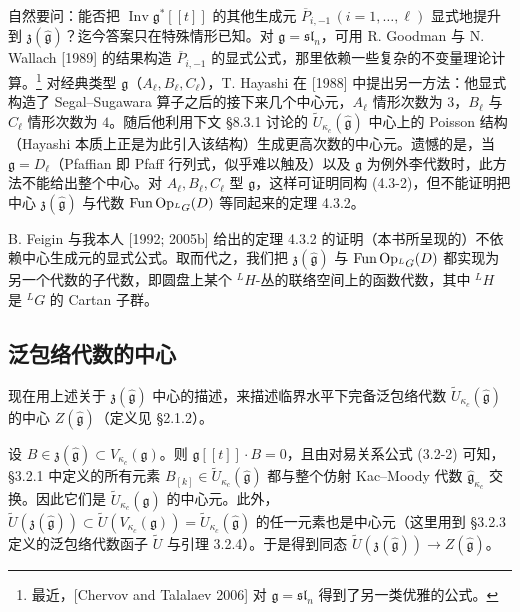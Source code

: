 自然要问：能否把 $\operatorname{Inv}\mathfrak{g}^*[[t]]$ 的其他生成元 $\overline{P}_{i,-1}\,(i=1,\dots,\ell)$ 显式地提升到 $\mathfrak{z}(\hat{\mathfrak{g}})$？迄今答案只在特殊情形已知。对 $\mathfrak{g}=\mathfrak{sl}_n$，可用 R. Goodman 与 N. Wallach [1989] 的结果构造 $\overline{P}_{i,-1}$ 的显式公式，那里依赖一些复杂的不变量理论计算。\footnote{最近，[Chervov and Talalaev 2006] 对 $\mathfrak{g}=\mathfrak{sl}_n$ 得到了另一类优雅的公式。} 对经典类型 $\mathfrak{g}$（$A_\ell,B_\ell,C_\ell$），T. Hayashi 在 [1988] 中提出另一方法：他显式构造了 Segal--Sugawara 算子之后的接下来几个中心元，$A_\ell$ 情形次数为 $3$，$B_\ell$ 与 $C_\ell$ 情形次数为 $4$。随后他利用下文 §8.3.1 讨论的 $\widetilde{U}_{\kappa_c}(\hat{\mathfrak{g}})$ 中心上的 Poisson 结构（Hayashi 本质上正是为此引入该结构）生成更高次数的中心元。遗憾的是，当 $\mathfrak{g}=D_\ell$（Pfaffian 即 Pfaff 行列式，似乎难以触及）以及 $\mathfrak{g}$ 为例外李代数时，此方法不能给出整个中心。对 $A_\ell,B_\ell,C_\ell$ 型 $\mathfrak{g}$，这样可证明同构 (4.3-2)，但不能证明把中心 $\mathfrak{z}(\hat{\mathfrak{g}})$ 与代数 $\operatorname{Fun}\operatorname{Op}_{{}^LG}(D)$ 等同起来的定理 4.3.2。

B. Feigin 与我本人 [1992; 2005b] 给出的定理 4.3.2 的证明（本书所呈现的）不依赖中心生成元的显式公式。取而代之，我们把 $\mathfrak{z}(\hat{\mathfrak{g}})$ 与 $\operatorname{Fun}\operatorname{Op}_{{}^LG}(D)$ 都实现为另一个代数的子代数，即圆盘上某个 ${}^LH$-丛的联络空间上的函数代数，其中 ${}^LH$ 是 ${}^LG$ 的 Cartan 子群。

\subsection{泛包络代数的中心}

现在用上述关于 $\mathfrak{z}(\hat{\mathfrak{g}})$ 中心的描述，来描述临界水平下完备泛包络代数 $\widetilde{U}_{\kappa_c}(\hat{\mathfrak{g}})$ 的中心 $Z(\hat{\mathfrak{g}})$（定义见 §2.1.2）。

设 $B\in\mathfrak{z}(\hat{\mathfrak{g}})\subset V_{\kappa_c}(\mathfrak{g})$。则 $\mathfrak{g}[[t]]\cdot B=0$，且由对易关系公式 (3.2-2) 可知，§3.2.1 中定义的所有元素 $B_{[k]}\in\widetilde{U}_{\kappa_c}(\hat{\mathfrak{g}})$ 都与整个仿射 Kac--Moody 代数 $\hat{\mathfrak{g}}_{\kappa_c}$ 交换。因此它们是 $\widetilde{U}_{\kappa_c}(\hat{\mathfrak{g}})$ 的中心元。此外，$\widetilde{U}(\mathfrak{z}(\hat{\mathfrak{g}}))\subset\widetilde{U}(V_{\kappa_c}(\mathfrak{g}))=\widetilde{U}_{\kappa_c}(\hat{\mathfrak{g}})$ 的任一元素也是中心元（这里用到 §3.2.3 定义的泛包络代数函子 $\widetilde{U}$ 与引理 3.2.4）。于是得到同态 $\widetilde{U}(\mathfrak{z}(\hat{\mathfrak{g}}))\to Z(\hat{\mathfrak{g}})$。

